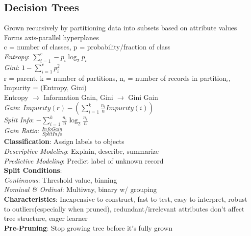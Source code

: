 \documentclass{article}
\begin{document}
\begin{multicols*}{2}
        \subsection*{Decision Trees}
        Grown recursively by partitioning data into subsets based on attribute values\\
        Forms axis-parallel hyperplanes\\
        c = number of classes, p = probability/fraction of class\\
        \textit{Entropy}: $\sum\limits_{i=1}^{c} -p_i \log_2 p_i$\\
        \textit{Gini}: $1 - \sum\limits_{i=1}^{c} p_i^2$\\
        r = parent, k = number of partitions, n$_i$ = number of records in partition$_i$, Impurity
        = (Entropy, Gini)\\
        Entropy $\to$ Information Gain, Gini $\to$ Gini Gain\\
        \textit{Gain}: $Impurity(r) - (\sum\limits_{i=1}^{k} \frac{n_i}{n} Impurity(i))$\\
        \textit{Split Info}: $-\sum\limits_{i=1}^{k} \frac{n_i}{n} \log_2 \frac{n_i}{n}$\\
        \textit{Gain Ratio}: $\frac{Info Gain}{Split Info}$\\
        \textbf{Classification}: Assign labels to objects\\
        \textit{Descriptive Modeling}: Explain, describe, summarize\\
        \textit{Predictive Modeling}: Predict label of unknown record\\
        \textbf{Split Conditions}:\\
        \textit{Continuous}: Threshold value, binning\\
        \textit{Nominal \& Ordinal}: Multiway, binary w/ grouping\\
        \textbf{Characteristics}: Inexpensive to construct, fast to test, easy to interpret,
        robust to outliers(especially when pruned), redundant/irrelevant attributes don't affect
        tree structure, eager learner\\
        \textbf{Pre-Pruning}: Stop growing tree before it's fully grown\\

\end{multicols*}
\end{document}
